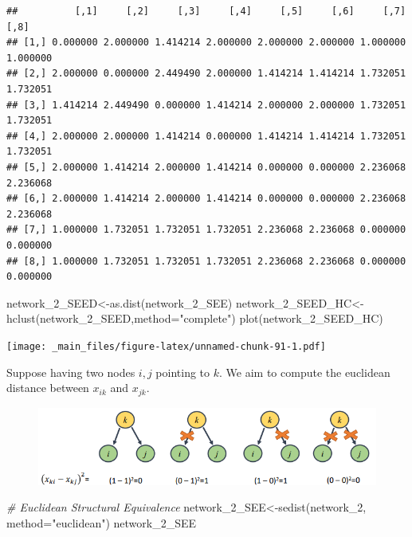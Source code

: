 \documentclass[
  notitlepage,
  onecolumn,
  openany]{book}
\newenvironment{Shaded}{\begin{snugshade}}{\end{snugshade}}
\newcommand{\AttributeTok}[1]{\textcolor[rgb]{0.77,0.63,0.00}{#1}}
\newcommand{\CommentTok}[1]{\textcolor[rgb]{0.56,0.35,0.01}{\textit{#1}}}
\newcommand{\FunctionTok}[1]{\textcolor[rgb]{0.00,0.00,0.00}{#1}}
\newcommand{\NormalTok}[1]{#1}
\newcommand{\OtherTok}[1]{\textcolor[rgb]{0.56,0.35,0.01}{#1}}
\newcommand{\StringTok}[1]{\textcolor[rgb]{0.31,0.60,0.02}{#1}}
\begin{document}
\begin{verbatim}
##          [,1]     [,2]     [,3]     [,4]     [,5]     [,6]     [,7]     [,8]
## [1,] 0.000000 2.000000 1.414214 2.000000 2.000000 2.000000 1.000000 1.000000
## [2,] 2.000000 0.000000 2.449490 2.000000 1.414214 1.414214 1.732051 1.732051
## [3,] 1.414214 2.449490 0.000000 1.414214 2.000000 2.000000 1.732051 1.732051
## [4,] 2.000000 2.000000 1.414214 0.000000 1.414214 1.414214 1.732051 1.732051
## [5,] 2.000000 1.414214 2.000000 1.414214 0.000000 0.000000 2.236068 2.236068
## [6,] 2.000000 1.414214 2.000000 1.414214 0.000000 0.000000 2.236068 2.236068
## [7,] 1.000000 1.732051 1.732051 1.732051 2.236068 2.236068 0.000000 0.000000
## [8,] 1.000000 1.732051 1.732051 1.732051 2.236068 2.236068 0.000000 0.000000
\end{verbatim}

\begin{Shaded}
\begin{Highlighting}[]
\NormalTok{network\_2\_SEED}\OtherTok{\textless{}{-}}\FunctionTok{as.dist}\NormalTok{(network\_2\_SEE)}
\NormalTok{network\_2\_SEED\_HC}\OtherTok{\textless{}{-}}\FunctionTok{hclust}\NormalTok{(network\_2\_SEED,}\AttributeTok{method=}\StringTok{"complete"}\NormalTok{)}
\FunctionTok{plot}\NormalTok{(network\_2\_SEED\_HC)}
\end{Highlighting}
\end{Shaded}

\texttt{[image: \_main\_files/figure-latex/unnamed-chunk-91-1.pdf]}

Suppose having two nodes \(i,j\) pointing to \(k\). We aim to compute the euclidean distance between \(x_{ik}\) and \(x_{jk}\).

\begin{figure}[h!]

{\centering \includegraphics[width=0.8\linewidth]{images/11-Subgroups and Structural Equivalence/Untitled 9} 

}

\end{figure}

\begin{Shaded}
\begin{Highlighting}[]
\CommentTok{\# Euclidean Structural Equivalence}
\NormalTok{network\_2\_SEE}\OtherTok{\textless{}{-}}\FunctionTok{sedist}\NormalTok{(network\_2, }\AttributeTok{method=}\StringTok{"euclidean"}\NormalTok{)}
\NormalTok{network\_2\_SEE}
\end{Highlighting}
\end{Shaded}
\end{document}
